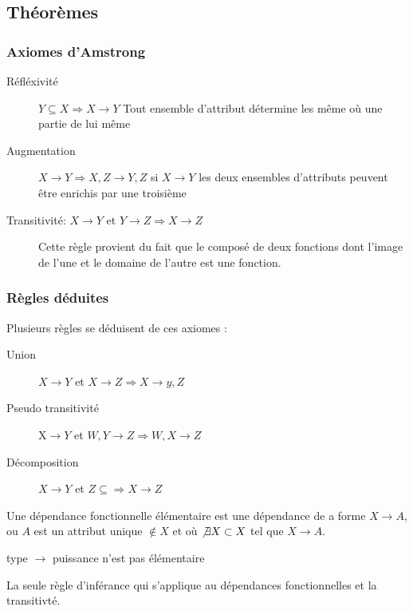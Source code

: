 \documentclass[12pt,a4paper,openany]{book}
\begin{document}
		\subsection{Théorèmes}
		\subsubsection{Axiomes d'Amstrong}
		\begin{description}
			\item[Réfléxivité] $Y \subseteq X \Rightarrow X \rightarrow Y$ Tout ensemble d'attribut détermine les même où une partie de lui même
			\item[Augmentation] $X\rightarrow Y \Rightarrow X,Z \rightarrow Y,Z$ si $X\rightarrow Y$ les deux ensembles d'attributs peuvent être
				enrichis par une troisième
			\item[Transitivité: $X\rightarrow Y$ et $Y \rightarrow Z \Rightarrow X\rightarrow Z$] Cette règle provient du fait que le composé de deux
				fonctions dont l'image de l'une et le domaine de l'autre est une fonction.
		\end{description}

		\subsubsection{Règles déduites}
		Plusieurs règles se déduisent de ces axiomes : 
		\begin{description}
			\item[Union] $X\rightarrow Y$ et $X\rightarrow Z \Rightarrow X \rightarrow y,Z$
			\item[Pseudo transitivité] X$\rightarrow Y$ et $W,Y \rightarrow Z \Rightarrow W,X \rightarrow Z$ 
			\item[Décomposition] $X\rightarrow Y$ et $Z\subseteq  \Rightarrow X\rightarrow Z$ 
		\end{description}

		\begin{definition}
			Une dépendance fonctionnelle élémentaire est une dépendance de a forme $X \rightarrow A$, ou $A$ est un attribut unique $\not\in X$ et où
			$\not\exists X \subset X$ tel que $X \rightarrow A$.
		\end{definition}
		\begin{exemple}
			type $\rightarrow$ puissance n'est pas élémentaire
		\end{exemple}
		\begin{remarque}
			La seule règle d'inférance qui s'applique au dépendances fonctionnelles et la transitivté.~\\
		\end{remarque}
\end{document}
